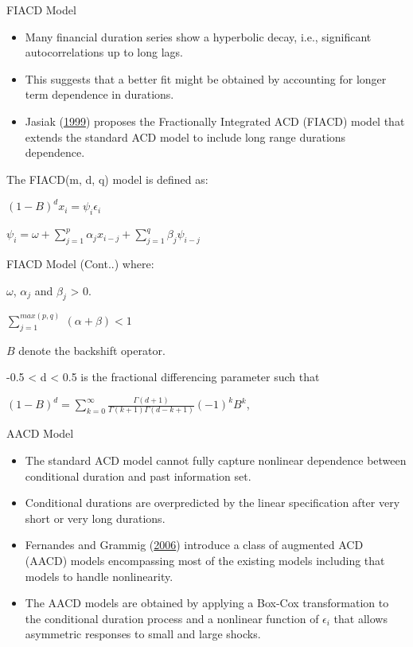 \documentclass[
  ignorenonframetext,
]{beamer}
\begin{document}
\begin{frame}{FIACD Model}
\protect\hypertarget{fiacd-model}{}
\begin{itemize}
\item
  Many financial duration series show a hyperbolic decay, i.e.,
  significant autocorrelations up to long lags.
\item
  This suggests that a better fit might be obtained by accounting for
  longer term dependence in durations.
\item
  Jasiak (\protect\hyperlink{ref-FIACD}{1999}) proposes the Fractionally
  Integrated ACD (FIACD) model that extends the standard ACD model to
  include long range durations dependence.
\end{itemize}

The FIACD(m, d, q) model is defined as:

\((1-B)^dx_i = \psi_i \epsilon_i\)

\(\psi_i = \omega + \sum_{j=1}^p \alpha_j x_{i-j} + \sum_{j=1}^q \beta_j \psi_{i-j}\)
\end{frame}

\begin{frame}{FIACD Model (Cont..)}
\protect\hypertarget{fiacd-model-cont..}{}
where:

\(\omega\), \(\alpha_j\) and \(\beta_j\) \textgreater{} 0.

\(\sum_{j=1}^{max(p,q)}\ (\alpha + \beta) < 1\)

\(B\) denote the backshift operator.

-0.5 \textless{} d \textless{} 0.5 is the fractional differencing
parameter such that

\((1-B)^d=\sum_{k=0}^{\infty}\frac{\Gamma(d+1)}{\Gamma(k+1)\Gamma(d-k+1)}(-1)^kB^k\),
\end{frame}

\begin{frame}{AACD Model}
\protect\hypertarget{aacd-model}{}
\begin{itemize}
\item
  The standard ACD model cannot fully capture nonlinear dependence
  between conditional duration and past information set.
\item
  Conditional durations are overpredicted by the linear specification
  after very short or very long durations.
\item
  Fernandes and Grammig (\protect\hyperlink{ref-AACD}{2006}) introduce a
  class of augmented ACD (AACD) models encompassing most of the existing
  models including that models to handle nonlinearity.
\item
  The AACD models are obtained by applying a Box-Cox transformation to
  the conditional duration process and a nonlinear function of
  \(\epsilon_i\) that allows asymmetric responses to small and large
  shocks.
\end{itemize}
\end{frame}
\end{document}
